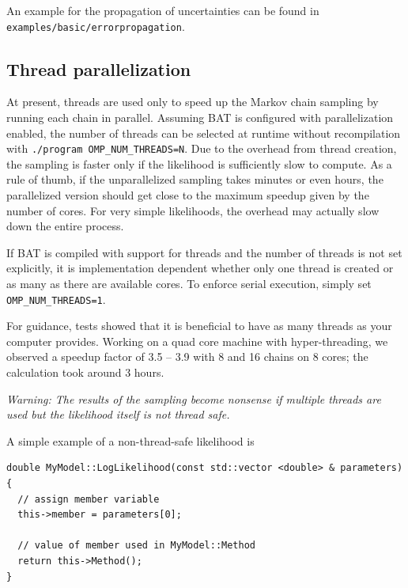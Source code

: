 \documentclass[11pt, a4paper]{article}
\begin{document}
An example for the propagation of uncertainties can be found in
\linebreak \verb|examples/basic/errorpropagation|.


\subsection{Thread parallelization}\label{subsection:thread-par}

At present, threads are used only to speed up the Markov chain
sampling by running each chain in parallel.  Assuming BAT is
configured with parallelization enabled, the number of threads can be
selected at runtime without recompilation with
\verb|./program OMP_NUM_THREADS=N|.  Due to the overhead from thread
creation, the sampling is faster only if the likelihood is
sufficiently slow to compute. As a rule of thumb, if the
unparallelized sampling takes minutes or even hours, the parallelized
version should get close to the maximum speedup given by the number of
cores. For very simple likelihoods, the overhead may actually slow
down the entire process.

If BAT is compiled with support for threads and the number of threads
is not set explicitly, it is implementation dependent whether only one
thread is created or as many as there are available cores. To enforce serial execution, simply set \verb|OMP_NUM_THREADS=1|.

For guidance, tests showed that it is beneficial to have as many threads as your
computer provides. Working on a quad core machine with hyper-threading, we
observed a speedup factor of 3.5 -- 3.9 with 8 and 16 chains on 8 cores; the
calculation took around 3 hours.

\emph{Warning: The results of the sampling become nonsense if multiple threads
are used but the likelihood itself is not thread safe.}

A simple example of a non-thread-safe likelihood is
\begin{verbatim}
double MyModel::LogLikelihood(const std::vector <double> & parameters)
{
  // assign member variable
  this->member = parameters[0];

  // value of member used in MyModel::Method
  return this->Method();
}
\end{verbatim}
\end{document}
